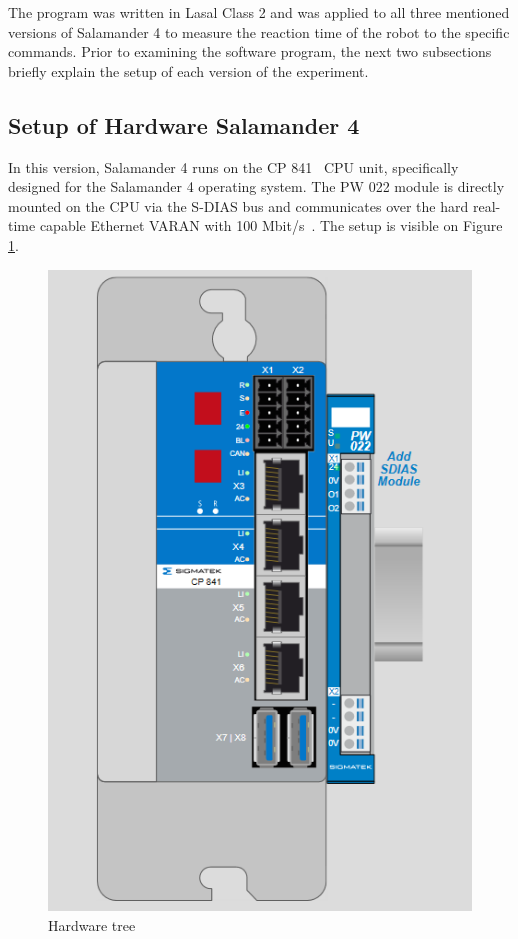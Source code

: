 \documentclass[MMR,Master,english]{twbook}
\begin{document}

\noindent The program was written in Lasal Class 2 and was applied to all three mentioned versions of Salamander 4 to measure the reaction time of the robot to the specific commands. Prior to examining the software program, the next two subsections briefly explain the setup of each version of the experiment. 

\subsection{Setup of Hardware Salamander 4}
In this version, Salamander 4 runs on the CP 841~\cite{CPUEinheitenSIGMATEK} CPU unit, specifically designed for the Salamander 4 operating system. The PW 022 module is directly mounted on the CPU via the S-DIAS bus and communicates over the hard real-time capable Ethernet VARAN with 100 Mbit/s~\cite{SDIASSIGMATEK}. The setup is visible on Figure \ref{fig:hardware_tree}.

\begin{figure}[H]
	\centering
	\includegraphics[width=0.5\columnwidth]{img/experiment/hardware_tree.png}
	\caption[Hardware tree]{Hardware tree}
	\label{fig:hardware_tree}
\end{figure}
\end{document}
